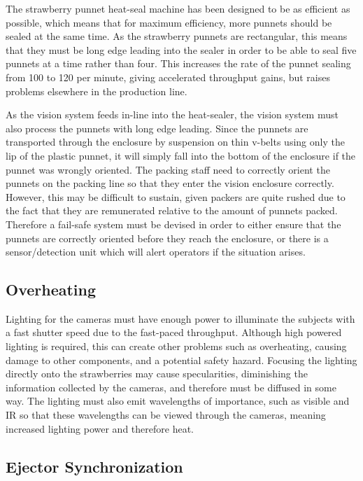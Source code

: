 \documentclass[fleqn,twoside,12pt]{report}
\begin{document}
The strawberry punnet heat-seal machine has been designed to be as efficient as possible, which means that for maximum efficiency, more punnets should be sealed at the same time. As the strawberry punnets are rectangular, this means that they must be long edge leading into the sealer in order to be able to seal five punnets at a time rather than four. This increases the rate of the punnet sealing from 100 to 120 per minute, giving accelerated throughput gains, but raises problems elsewhere in the production line. 

As the vision system feeds in-line into the heat-sealer, the vision system must also process the punnets with long edge leading. Since the punnets are transported through the enclosure by suspension on thin v-belts using only the lip of the plastic punnet, it will simply fall into the bottom of the enclosure if the punnet was wrongly oriented. The packing staff need to correctly orient the punnets on the packing line so that they enter the vision enclosure correctly. However, this may be difficult to sustain, given packers are quite rushed due to the fact that they are remunerated relative to the amount of punnets packed. Therefore a fail-safe system must be devised in order to either ensure that the punnets are correctly oriented before they reach the enclosure, or there is a sensor/detection unit which will alert operators if the situation arises.


\subsection{Overheating}

Lighting for the cameras must have enough power to illuminate the subjects with a fast shutter speed due to the fast-paced throughput. Although high powered lighting is required, this can create other problems such as overheating, causing damage to other components, and a potential safety hazard. Focusing the lighting directly onto the strawberries may cause specularities, diminishing the information collected by the cameras, and therefore must be diffused in some way. The lighting must also emit wavelengths of importance, such as visible and IR so that these wavelengths can be viewed through the cameras, meaning increased lighting power and therefore heat.



\subsection{Ejector Synchronization}
\end{document}

